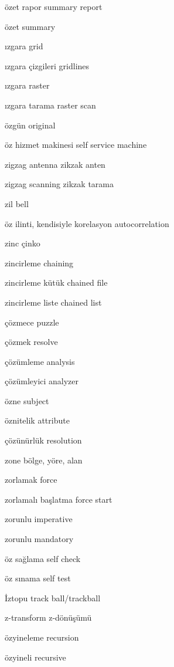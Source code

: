 \documentclass[12pt,fleqn]{article}\usepackage{../../common}
\begin{document}
özet rapor summary report

özet summary

ızgara grid

ızgara çizgileri gridlines

ızgara raster

ızgara tarama raster scan

özgün original

öz hizmet makinesi self service machine

zigzag antenna zikzak anten

zigzag scanning zikzak tarama

zil bell

öz ilinti, kendisiyle korelasyon autocorrelation

zinc çinko

zincirleme chaining

zincirleme kütük chained file

zincirleme liste chained list

çözmece puzzle

çözmek resolve

çözümleme analysis

çözümleyici analyzer

özne subject

öznitelik attribute

çözünürlük resolution

zone bölge, yöre, alan

zorlamak force

zorlamalı başlatma force start

zorunlu imperative

zorunlu mandatory

öz sağlama self check

öz sınama self test

İztopu track ball/trackball

z-transform z-dönüşümü

özyineleme recursion

özyineli recursive
\end{document}
